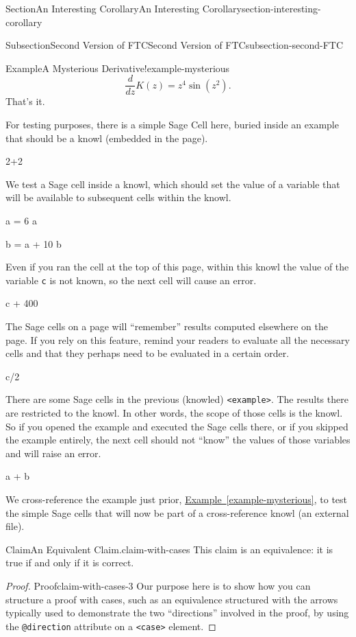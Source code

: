 \documentclass[twoside,10pt,]{article}
\newcommand{\xreffont}{\relax}
\newcommand{\mono}[1]{\texttt{#1}}
\DeclareRobustCommand{\acronymintitle}[1]{\texorpdfstring{#1}{#1}}
\numberwithin{equation}{section}
\begin{document}
\begin{sectionptx}{Section}{An Interesting Corollary}{}{An Interesting Corollary}{}{}{section-interesting-corollary}
\begin{subsectionptx}{Subsection}{Second Version of \acronymintitle{FTC}}{}{Second Version of \acronymintitle{FTC}}{}{}{subsection-second-FTC}
\begin{example}{Example}{A Mysterious Derivative!}{example-mysterious}
\begin{equation*}
\frac{d}{dz}K(z)=z^4\sin(z^2)\text{.}
\end{equation*}
That's it.%
\par
For testing purposes, there is a simple Sage Cell here, buried inside an example that should be a knowl (embedded in the page).%
\begin{sageinput}
2+2
\end{sageinput}
We test a Sage cell inside a knowl, which should set the value of a variable that will be available to subsequent cells within the knowl.%
\begin{sageinput}
a = 6
a
\end{sageinput}
\begin{sageinput}
b = a + 10
b
\end{sageinput}
Even if you ran the cell at the top of this page, within this knowl the value of the variable \mono{c} is not known, so the next cell will cause an error.%
\begin{sageinput}
c + 400
\end{sageinput}
\end{example}
The Sage cells on a page will ``remember'' results computed elsewhere on the page.  If you rely on this feature, remind your readers to evaluate all the necessary cells and that they perhaps need to be evaluated in a certain order.%
\begin{sageinput}
c/2
\end{sageinput}
There are some Sage cells in the previous (knowled) \mono{<example>}.  The results there are restricted to the knowl.  In other words, the scope of those cells is the knowl.  So if you opened the example and executed the Sage cells there, or if you skipped the example entirely, the next cell should not ``know'' the values of those variables and will raise an error.%
\begin{sageinput}
a + b
\end{sageinput}
We cross-reference the example just prior, \hyperref[example-mysterious]{Example~{\xreffont\ref{example-mysterious}}}, to test the simple Sage cells that will now be part of a cross-reference knowl (an external file).%
\begin{claim}{Claim}{An Equivalent Claim.}{}{claim-with-cases}%
This claim is an equivalence: it is true if and only if it is correct.%
\end{claim}
\begin{proof}{Proof}{}{claim-with-cases-3}
Our purpose here is to show how you can structure a proof with cases, such as an equivalence structured with the arrows typically used to demonstrate the two ``directions'' involved in the proof, by using the \mono{@direction} attribute on a \mono{<case>} element.%

\end{proof}
\end{subsectionptx}
\end{sectionptx}
\end{document}
